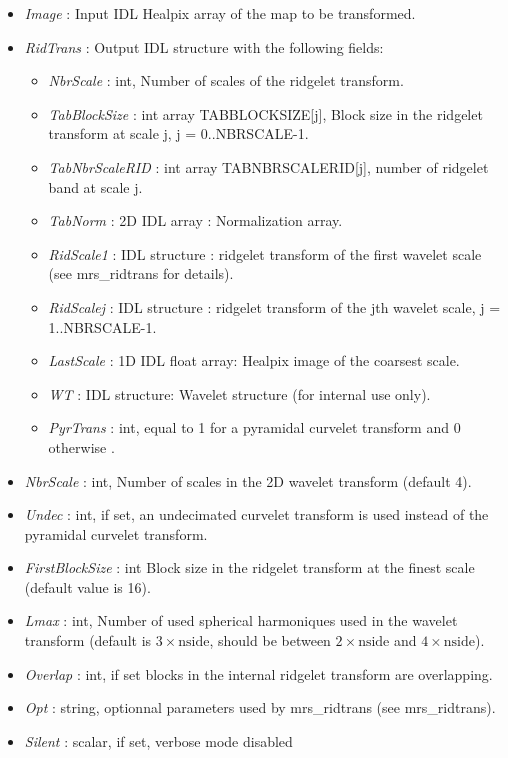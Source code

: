 \begin{itemize}
\item {\em Image} : Input IDL Healpix array of the map to be transformed.
\item {\em RidTrans} : Output IDL structure with the following fields: 
\begin{itemize} 
\item {\em NbrScale} : int, Number of scales of the ridgelet transform.
\item {\em TabBlockSize} : int array TABBLOCKSIZE[j], Block size in the ridgelet transform at scale j, j = 0..NBRSCALE-1.
\item {\em TabNbrScaleRID} : int array TABNBRSCALERID[j], number of ridgelet band at scale j.
\item {\em TabNorm} : 2D IDL array : Normalization array.
\item {\em RidScale1} : IDL structure : ridgelet transform of the first wavelet scale (see mrs\_ridtrans for details).
\item {\em RidScalej} : IDL structure : ridgelet transform of the jth wavelet scale, j = 1..NBRSCALE-1.
\item {\em LastScale} : 1D IDL float array: Healpix image of the coarsest scale.
\item {\em WT} : IDL structure: Wavelet structure (for internal use only).
\item {\em PyrTrans} : int, equal to 1 for a pyramidal curvelet transform and 0 otherwise .
\end{itemize}
\item {\em NbrScale} : int, Number of scales in the 2D wavelet transform (default 4).
\item {\em Undec} : int, if set, an undecimated curvelet transform is used instead of the pyramidal curvelet transform.
\item {\em FirstBlockSize} : int Block size in the ridgelet transform at the finest scale (default value is 16).
\item {\em Lmax} : int, Number of used spherical harmoniques used in the wavelet transform 
(default is $3\times \textrm{nside}$, should be between $2\times \textrm{nside}$ and $4\times \textrm{nside}$).
\item {\em Overlap} : int, if set blocks in the internal ridgelet transform are overlapping.
\item {\em Opt} : string, optionnal parameters used by mrs\_ridtrans (see mrs\_ridtrans).
\item {\em Silent} : scalar, if set, verbose mode disabled
\end{itemize}


